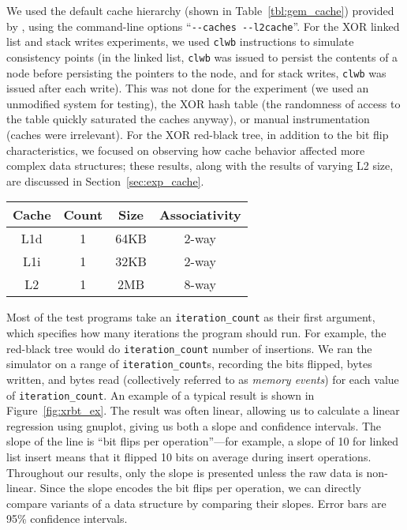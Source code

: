 We used the default cache hierarchy (shown in Table~\ref{tbl:gem_cache}) provided by \gem, using the
command-line options ``\texttt{-{}-caches -{}-l2cache}''.  For the XOR linked list and stack writes
experiments, we used \texttt{clwb} instructions to simulate consistency points (in the linked list,
\texttt{clwb} was issued to persist the contents of a node before persisting the pointers to the
node, and for stack writes, \texttt{clwb} was issued after each write). This was not done
for the \malloc experiment (we used an unmodified system \malloc for testing), the XOR hash table
(the randomness of access to the table quickly saturated the caches anyway), or manual
instrumentation (caches were irrelevant). For the XOR red-black tree, in addition to the bit flip
characteristics, we focused on observing how cache behavior affected more complex data structures;
these results, along with the results of varying L2 size, are discussed in
Section~\ref{sec:exp_cache}.



\begin{SCtable}
	\centering
	\caption{Cache parameters used in \gem.}
	\label{tbl:gem_cache}
	\begin{tabular}{c | c | c | c}
		\textbf{Cache} & \textbf{Count} & \textbf{Size} & \textbf{Associativity}
		\\
		\hline
		L1d            & 1              & 64KB          & 2-way                  \\
		L1i            & 1              & 32KB          & 2-way                  \\
		L2             & 1              & 2MB           & 8-way                  \\
	\end{tabular}
\end{SCtable}

Most of the test programs take an
\texttt{iteration\_count} as their first argument, which specifies how many iterations the program should run. For
example, the red-black tree would do \texttt{iteration\_count}
number of insertions. We ran the simulator on a range of
\texttt{iteration\_count}s,
recording the bits flipped, bytes written, and bytes read (collectively referred
to as \textit{memory events}) for each value of \texttt{iteration\_count}.
An example of a typical
result is shown in Figure~\ref{fig:xrbt_ex}. The result was often linear,
allowing us to calculate a linear regression using gnuplot,
giving us both a slope and confidence intervals. The slope of the line is ``bit
flips per operation''---for example, a slope of 10 for linked list insert means
that it flipped 10 bits on average during insert operations.
Throughout our results, only the slope is presented unless the raw data is
non-linear. Since the slope encodes the bit flips per operation, we can directly
compare variants of a data structure by comparing their slopes. Error bars are
95\% confidence intervals.

